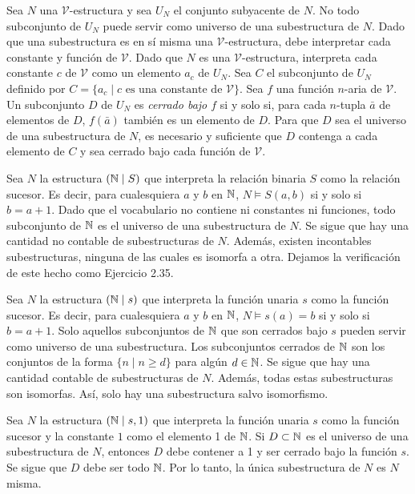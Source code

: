 \message{ !name(main.tex)}\documentclass[12pt,a4paper]{book}
\newcommand{\VV}{\mathcal{V}}
\begin{document}
    Sea $N$ una $\VV$-estructura y sea $U_{N}$ el conjunto subyacente de $N$. No todo subconjunto de $U_{N}$ puede servir
    como universo de una subestructura de $N$. Dado que una subestructura es en sí misma una $\VV$-estructura, debe
    interpretar cada constante y función de $\VV$. Dado que $N$ es una $\VV$-estructura, interpreta cada constante $c$ de
    $\VV$ como un elemento $a_{c}$ de $U_{N}$. Sea $C$ el subconjunto de $U_{N}$ definido por $C=\{a_{c}\mid c\text{ es una
    constante de }\VV\}$. Sea $f$ una función $n$-aria de $\VV$. Un subconjunto $D$ de $U_{N}$ es \textit{cerrado bajo $f$}
    si y solo si, para cada $n$-tupla $\bar{a}$ de elementos de $D$, $f(\bar{a})$ también es un elemento de $D$. Para que
    $D$ sea el universo de una subestructura de $N$, es necesario y suficiente que $D$ contenga a cada elemento de $C$ y
    sea cerrado bajo cada función de $\VV$.

    \begin{ejemplo}\label{ej:subestructuras-sucesor-relacion}
        Sea $N$ la estructura $(\mathbb{N}\mid S)$ que interpreta la relación binaria $S$ como la relación sucesor. Es decir, para
        cualesquiera $a$ y $b$ en $\mathbb{N}$, $N\models S(a,b)$ si y solo si $b=a+1$. Dado que el vocabulario no contiene ni
        constantes ni funciones, todo subconjunto de $\mathbb{N}$ es el universo de una subestructura de $N$. Se sigue que hay una
        cantidad no contable de subestructuras de $N$. Además, existen incontables subestructuras, ninguna de las cuales es
        isomorfa a otra. Dejamos la verificación de este hecho como Ejercicio 2.35.
    \end{ejemplo}

    \begin{ejemplo}\label{ej:subestructuras-sucesor-funcion}
        Sea $N$ la estructura $(\mathbb{N}\mid s)$ que interpreta la función unaria $s$ como la función sucesor. Es decir, para
        cualesquiera $a$ y $b$ en $\mathbb{N}$, $N\models s(a)=b$ si y solo si $b=a+1$. Solo aquellos subconjuntos de $\mathbb{N}$ que son
        cerrados bajo $s$ pueden servir como universo de una subestructura. Los subconjuntos cerrados de $\mathbb{N}$ son los
        conjuntos de la forma $\{n\mid n\geq d\}$ para algún $d\in\mathbb{N}$. Se sigue que hay una cantidad contable de
        subestructuras de $N$. Además, todas estas subestructuras son isomorfas. Así, solo hay una subestructura salvo
        isomorfismo.
    \end{ejemplo}

    \begin{ejemplo}
        Sea $N$ la estructura $(\mathbb{N}\mid s,1)$ que interpreta la función unaria $s$ como la función sucesor y la constante
        $1$ como el elemento 1 de $\mathbb{N}$. Si $D\subset\mathbb{N}$ es el universo de una subestructura de $N$, entonces $D$ debe
        contener a 1 y ser cerrado bajo la función $s$. Se sigue que $D$ debe ser todo $\mathbb{N}$. Por lo tanto, la única
        subestructura de $N$ es $N$ misma.
    \end{ejemplo}
\end{document}
